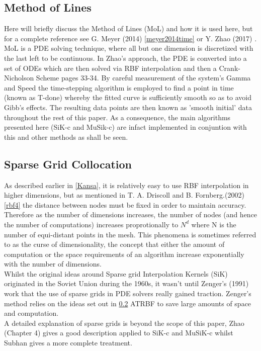 \documentclass[a4paper]{amsart}
\begin{document}
\subsection{Method of Lines}
Here will briefly discuss the Method of Lines (MoL) and how it is used here, but for a complete reference see G. Meyer (2014) \ref{meyer2014time} or Y. Zhao (2017) \cite{mski0}. MoL is a PDE solving technique, where all but one dimension is discretized with the last left to be continuous. In Zhao's approach, the PDE is converted into a set of ODEs which are then solved via RBF interpolation and then a Crank-Nicholson Scheme \cite{mski0} pages 33-34. By careful measurement of the system's Gamma and Speed the time-stepping algorithm is employed to find a point in time (known as T-done) whereby the fitted curve is sufficiently smooth so as to avoid Gibb's effects. The resulting data points are then known as 'smooth initial' data throughout the rest of this paper. As a consequence, the main algorithms presented here (SiK-c and MuSik-c) are infact implemented in conjuntion with this and other methods as shall be seen.

\subsection{Sparse Grid Collocation}

As described earlier in \ref{Kansa}, it is relatively easy to use RBF interpolation in higher dimensions, but as mentioned in T. A. Driscoll and B. Fornberg.(2002) \ref{rbf4} the distance between nodes must be fixed in order to maintain accuracy. Therefore as the number of dimensions increases, the number of nodes (and hence the number of computations) increases proprotionally to $N^{d}$ where N is the number of equi-distant points in the mesh. This phenomena is sometimes referred to as the curse of dimensionality, the concept that either the amount of computation or the space requirements of an algorithm increase exponentially with the number of dimensions.\\

Whilst the original ideas around Sparse grid Interpolation Kernels (SiK) originated in the Soviet Union\cite{sik1}\cite{sik2} during the 1960s, it wasn't until Zenger's (1991) \cite{sik3} work that the use of sparse grids in PDE solvers really gained traction. Zenger's method relies on the ideas set out in \ref{} ATRBF to save large amounts of space and computation.\\

A detailed explanation of sparse grids is beyond the scope of this paper, Zhao \cite{mski0} (Chapter 4) gives a good description applied to SiK-c and MuSiK-c whilst Subhan \cite{mski} gives a more complete treatment.\\
\end{document}

